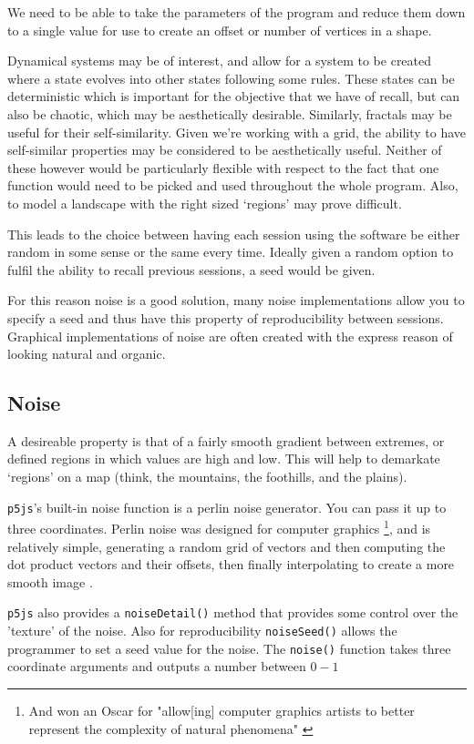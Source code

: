 We need to be able to take the parameters of the program and reduce them down to
a single value for use to create an offset or number of vertices in a shape.

Dynamical systems may be of interest, and allow for a system to be created where
a state evolves into other states following some rules. These states can be
deterministic which is important for the objective that we have of recall, but
can also be chaotic, which may be aesthetically desirable. Similarly, fractals
may be useful for their self-similarity. Given we're working with a grid, the
ability to have self-similar properties may be considered to be aesthetically
useful. Neither of these however would be particularly flexible with respect to
the fact that one function would need to be picked and used throughout the whole
program. Also, to model a landscape with the right sized `regions' may prove
difficult.

This leads to the choice between having each session using the software be
either random in some sense or the same every time. Ideally given a random
option to fulfil the ability to recall previous sessions, a seed would be given.

For this reason noise is a good solution, many noise implementations allow you
to specify a seed and thus have this property of reproducibility between
sessions. Graphical implementations of noise are often created with the express
reason of looking natural and organic.

\subsection{Noise}
A desireable property is that of a fairly smooth gradient between extremes, or
defined regions in which values are high and low. This will help to demarkate
`regions' on a map (think, the mountains, the foothills, and the plains). 

\verb|p5js|'s built-in noise function is a perlin noise generator. You can pass
it up to three coordinates. Perlin noise was designed for computer graphics
\footnote{And won an Oscar for "allow[ing] computer graphics artists to better
represent the complexity of natural phenomena" \citep{nyu_perlin}}, and is relatively simple,
generating a random grid of vectors and then computing the dot product vectors
and their offsets, then finally interpolating to create a more smooth image
\citep{10.1145/566570.566636}.

\verb|p5js| also provides a \verb|noiseDetail()| method that provides some
control over the 'texture' of the noise. Also for reproducibility
\verb|noiseSeed()| allows the programmer to set a seed value for the noise.
The \verb|noise()| function takes three coordinate arguments and outputs a
number between $0-1$

